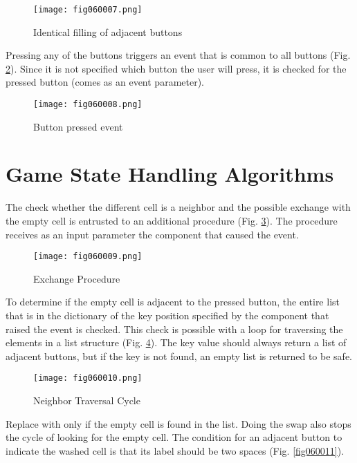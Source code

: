 \begin{figure}[H]
   \centering
   \texttt{[image: fig060007.png]}
   \caption{Identical filling of adjacent buttons}
\label{fig060007}
\end{figure}

Pressing any of the buttons triggers an event that is common to all buttons (Fig. \ref{fig060008}). Since it is not specified which button the user will press, it is checked for the pressed button (comes as an event parameter).

\begin{figure}[H]
   \centering
   \texttt{[image: fig060008.png]}
   \caption{Button pressed event}
\label{fig060008}
\end{figure}

\section{Game State Handling Algorithms}

The check whether the different cell is a neighbor and the possible exchange with the empty cell is entrusted to an additional procedure (Fig. \ref{fig060009}). The procedure receives as an input parameter the component that caused the event.

\begin{figure}[H]
   \centering
   \texttt{[image: fig060009.png]}
   \caption{Exchange Procedure}
\label{fig060009}
\end{figure}

To determine if the empty cell is adjacent to the pressed button, the entire list that is in the dictionary of the key position specified by the component that raised the event is checked. This check is possible with a loop for traversing the elements in a list structure (Fig. \ref{fig060010}). The key value should always return a list of adjacent buttons, but if the key is not found, an empty list is returned to be safe.

\begin{figure}[H]
   \centering
   \texttt{[image: fig060010.png]}
   \caption{Neighbor Traversal Cycle}
\label{fig060010}
\end{figure}

Replace with only if the empty cell is found in the list. Doing the swap also stops the cycle of looking for the empty cell. The condition for an adjacent button to indicate the washed cell is that its label should be two spaces (Fig. \ref{fig060011}).

